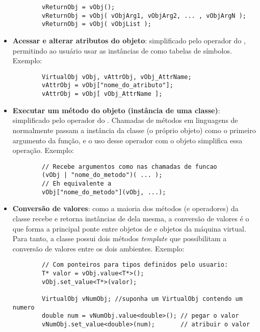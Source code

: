 \begin{itemize}
\begin{lstlisting}
        vReturnObj = vObj();
        vReturnObj = vObj( vObjArg1, vObjArg2, ... , vObjArgN );
        vReturnObj = vObj( vObjList );
      \end{lstlisting}
    \item \textbf{Acessar e alterar atributos do objeto}: simplificado pelo operador
      \lang{[]} do \CXX{}, permitindo ao usuário usar as instâncias de \VObj{} como
      tabelas de símbolos. Exemplo:
      \begin{lstlisting}
        VirtualObj vObj, vAttrObj, vObj_AttrName;
        vAttrObj = vObj["nome_do_atributo"];
        vAttrObj = vObj[ vObj_AttrName ];
      \end{lstlisting}
    \item \textbf{Executar um método do objeto (instância de uma classe)}: simplificado pelo
      operador \lang{|} do \CXX{}. Chamadas de métodos em linguagens de \script{} normalmente
      passam a instância da classe (o próprio objeto) como o primeiro argumento da
      função, e o uso desse operador com o objeto simplifica essa operação. Exemplo: 
      \begin{lstlisting}
        // Recebe argumentos como nas chamadas de funcao
        (vObj | "nome_do_metodo")( ... );
        // Eh equivalente a
        vObj["nome_do_metodo"](vObj, ...);
      \end{lstlisting}
    \item \textbf{Conversão de valores}: como a maioria dos métodos (e operadores) da classe
      \VObj{} recebe e retorna instâncias de dela mesma, a conversão de valores é o que forma a
      principal ponte entre objetos de \CXX{} e objetos da máquina virtual. Para tanto, a classe
      possui dois métodos \textit{template}\footnotemark{} que possibilitam a conversão de
      valores entre os dois ambientes. Exemplo:
      \begin{lstlisting}
        // Com ponteiros para tipos definidos pelo usuario:
        T* valor = vObj.value<T*>();
        vObj.set_value<T*>(valor);
        
        VirtualObj vNumObj; //suponha um VirtualObj contendo um numero
        double num = vNumObj.value<double>(); // pegar o valor
        vNumObj.set_value<double>(num);       // atribuir o valor
      \end{lstlisting}
  \end{itemize}

  
